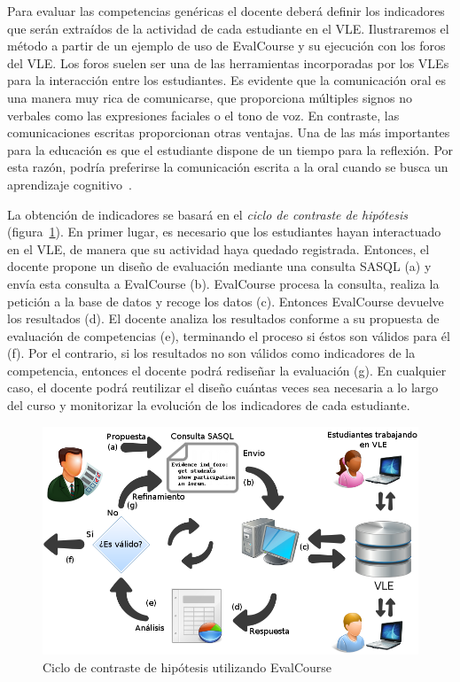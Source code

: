 			Para evaluar las competencias genéricas el docente deberá definir los indicadores que serán extraídos de la actividad de cada estudiante en el VLE. Ilustraremos el método a partir de un ejemplo de uso de EvalCourse y su ejecución con los foros del VLE. Los foros suelen ser una de las herramientas incorporadas por los VLEs para la interacción entre los estudiantes. Es evidente que la comunicación oral es una manera muy rica de comunicarse, que proporciona múltiples signos no verbales como las expresiones faciales o el tono de voz. En contraste, las comunicaciones escritas proporcionan otras ventajas. Una de las más importantes para la educación es que el estudiante dispone de un tiempo para la reflexión. Por esta razón, podría preferirse la comunicación escrita a la oral cuando se busca un aprendizaje cognitivo~\cite{garrison1999critical}.

			La obtención de indicadores se basará en el \emph{ciclo de contraste de hipótesis} (figura~\ref{fig:EVCDiagram}). En primer lugar, es necesario que los estudiantes hayan interactuado en el VLE, de manera que su actividad haya quedado registrada. Entonces, el docente propone un diseño de evaluación mediante una consulta SASQL (a) y envía esta consulta a EvalCourse (b). EvalCourse procesa la consulta, realiza la petición a la base de datos y recoge los datos (c). Entonces EvalCourse devuelve los resultados (d). El docente analiza los resultados conforme a su propuesta de evaluación de competencias (e), terminando el proceso si éstos son válidos para él (f). Por el contrario, si los resultados no son válidos como indicadores de la competencia, entonces el docente podrá rediseñar la evaluación (g). En cualquier caso, el docente podrá reutilizar el diseño cuántas veces sea necesaria a lo largo del curso y monitorizar la evolución de los indicadores de cada estudiante.

\begin{figure}
  \begin{center}
    \includegraphics[scale=0.45]{EvcDiagram.png}
  \end{center}
  \caption{Ciclo de contraste de hipótesis utilizando EvalCourse}
  \label{fig:EVCDiagram}
\end{figure}

